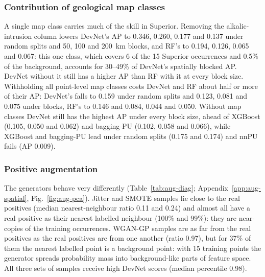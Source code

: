 \documentclass[pdflatex,sn-apa]{sn-jnl}
\begin{document}
\subsubsection{Contribution of geological map classes}\label{sec:res-featuresets}

A single map class carries much of the skill in Superior. Removing the alkalic-intrusion column lowers DevNet's AP to 0.346, 0.260, 0.177 and 0.137 under random splits and 50, 100 and 200~km blocks, and RF's to 0.194, 0.126, 0.065 and 0.067: this one class, which covers 6 of the 15 Superior occurrences and 0.5\% of the background, accounts for 30--49\% of DevNet's spatially blocked AP. DevNet without it still has a higher AP than RF with it at every block size. Withholding all point-level map classes costs DevNet and RF about half or more of their AP: DevNet's falls to 0.159 under random splits and 0.123, 0.081 and 0.075 under blocks, RF's to 0.146 and 0.084, 0.044 and 0.050. Without map classes DevNet still has the highest AP under every block size, ahead of XGBoost (0.105, 0.050 and 0.062) and bagging-PU (0.102, 0.058 and 0.066), while XGBoost and bagging-PU lead under random splits (0.175 and 0.174) and nnPU fails (AP 0.009).

\subsubsection{Positive augmentation}\label{sec:res-augmentation}

The generators behave very differently (Table~\ref{tab:aug-diag}; Appendix~\ref{app:aug-spatial}, Fig.~\ref{fig:aug-pca}). Jitter and SMOTE samples lie close to the real positives (median nearest-neighbour ratio 0.11 and 0.24) and almost all have a real positive as their nearest labelled neighbour (100\% and 99\%): they are near-copies of the training occurrences. WGAN-GP samples are as far from the real positives as the real positives are from one another (ratio 0.97), but for 37\% of them the nearest labelled point is a background point: with 15 training points the generator spreads probability mass into background-like parts of feature space. All three sets of samples receive high DevNet scores (median percentile 0.98).
\end{document}
